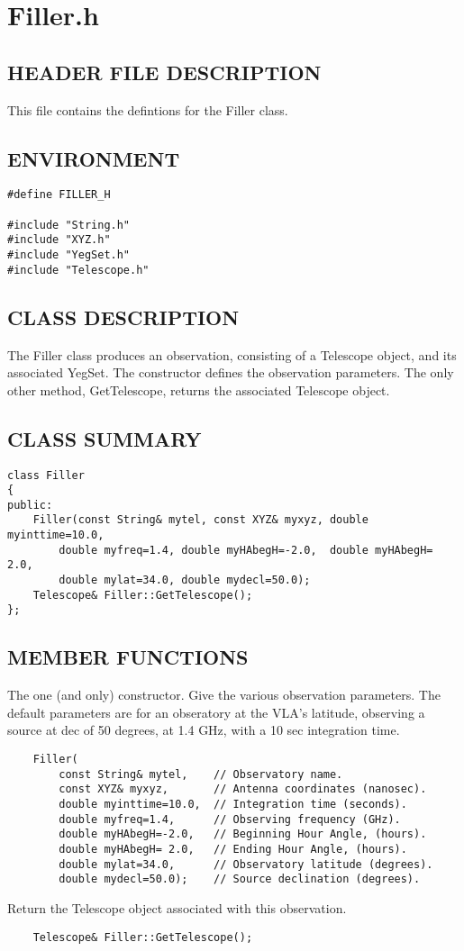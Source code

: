 \clearpage
\section{Filler.h}

\subsection*{HEADER FILE DESCRIPTION}
   This file contains the defintions for the Filler class.
  
\subsection*{ENVIRONMENT}
\begin{verbatim}
#define FILLER_H

#include "String.h"
#include "XYZ.h"
#include "YegSet.h"
#include "Telescope.h"
\end{verbatim}

\subsection*{CLASS DESCRIPTION}
   The Filler class produces an observation, consisting of a Telescope
   object, and its associated YegSet.
   The constructor defines the observation parameters. The only other
   method, GetTelescope, returns the associated Telescope object.

\subsection*{CLASS SUMMARY}
\begin{verbatim}
class Filler
{
public:
    Filler(const String& mytel, const XYZ& myxyz, double myinttime=10.0,
        double myfreq=1.4, double myHAbegH=-2.0,  double myHAbegH= 2.0,
        double mylat=34.0, double mydecl=50.0);
    Telescope& Filler::GetTelescope();
};
\end{verbatim}

\subsection*{MEMBER FUNCTIONS}
  
   The one (and only) constructor. Give the various observation parameters.
   The default parameters are for an obseratory at the VLA's latitude,
   observing a source at dec of 50 degrees, at 1.4 GHz, with a 10 sec
   integration time.
\begin{verbatim}
    Filler(
        const String& mytel,    // Observatory name.
        const XYZ& myxyz,       // Antenna coordinates (nanosec).
        double myinttime=10.0,  // Integration time (seconds).
        double myfreq=1.4,      // Observing frequency (GHz).
        double myHAbegH=-2.0,   // Beginning Hour Angle, (hours).
        double myHAbegH= 2.0,   // Ending Hour Angle, (hours).
        double mylat=34.0,      // Observatory latitude (degrees).
        double mydecl=50.0);    // Source declination (degrees).
\end{verbatim}

   Return the Telescope object associated with this observation.
\begin{verbatim}
    Telescope& Filler::GetTelescope();
\end{verbatim}
